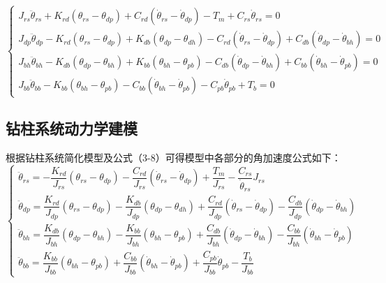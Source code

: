 \documentclass[12pt,hyperref,a4paper,UTF8]{ctexart}
\begin{document}
	\begin{equation}
		\left\{ \begin{array}{l}
			{J_{rs}}{{\ddot \theta }_{rs}} + {K_{rd}}({\theta _{rs}} - {\theta _{dp}}) + {C_{rd}}({{\dot \theta }_{rs}} - {{\dot \theta }_{dp}}) - {T_m} + {C_{rs}}{{\dot \theta }_{rs}} = 0\\
			{J_{dp}}{{\ddot \theta }_{dp}} - {K_{rd}}({\theta _{rs}} - {\theta _{dp}}) + {K_{db}}({\theta _{dp}} - {\theta _{dh}}) - {C_{rd}}({{\dot \theta }_{rs}} - {{\dot \theta }_{dp}}) + {C_{db}}({{\dot \theta }_{dp}} - {{\dot \theta }_{bh}}) = 0\\
			{J_{bh}}{{\ddot \theta }_{bh}} - {K_{db}}({\theta _{dp}} - {\theta _{bh}}) + {K_{bb}}({\theta _{bh}} - {\theta _{pb}}) - {C_{db}}({{\dot \theta }_{dp}} - {{\dot \theta }_{bh}}) + {C_{bb}}({{\dot \theta }_{bh}} - {{\dot \theta }_{pb}}) = 0\\
			{J_{bb}}{{\ddot \theta }_{bb}} - {K_{bb}}({\theta _{bh}} - {\theta _{pb}}) - {C_{bb}}({{\dot \theta }_{bh}} - {{\dot \theta }_{pb}}) - {C_{pb}}{{\dot \theta }_{pb}} + {T_b} = 0
		\end{array} \right.
		\label{钻柱系统的运动微分方程改写}
	\end{equation}
	
	\subsection{钻柱系统动力学建模}
	根据钻柱系统简化模型及公式（3-8）可得模型中各部分的角加速度公式如下： 
	\begin{equation}
		\left\{ \begin{array}{l}
			{\ddot \theta_{rs}} = -\dfrac{K_{rd}}{J_{rs}}(\theta_{rs} - \theta_{dp}) - \dfrac{C_{rd}}{J_{rs}}(\dot \theta_{rs} - \dot \theta_{dp}) + \dfrac{T_m}{J_{rs}} - \dfrac{C_{rs}}{{\dot \theta }_{rs}}{J_{rs}} \\
			{\ddot \theta_{dp}} = \dfrac{K_{rd}}{J_{dp}}(\theta_{rs} - \theta_{dp}) - \dfrac{K_{db}}{J_{dp}}(\theta_{dp} - \theta_{dh}) + \dfrac{C_{rd}}{J_{dp}}(\dot \theta_{rs} - \dot \theta_{dp}) - \dfrac{C_{db}}{J_{dp}}(\dot \theta_{dp} - \dot \theta_{bh}) \\
			{\ddot \theta_{bh}} = \dfrac{K_{db}}{J_{bh}}(\theta_{dp} - \theta_{bh}) - \dfrac{K_{bb}}{J_{bh}}(\theta_{bh} - \theta_{pb}) + \dfrac{C_{db}}{J_{bh}}(\dot \theta_{dp} - \dot \theta_{bh}) - \dfrac{C_{bb}}{J_{bh}}(\dot \theta_{bh} - \dot \theta_{pb}) \\
			{\ddot \theta_{bb}} = \dfrac{K_{bb}}{J_{bb}}(\theta_{bh} - \theta_{pb}) + \dfrac{C_{bb}}{J_{bb}}(\dot \theta_{bh} - \dot \theta_{pb}) + \dfrac{C_{pb}}{J_{bb}} \dot \theta_{pb} - \dfrac{T_b}{J_{bb}} 
		\end{array} \right.
	\end{equation}
	
\end{document}
